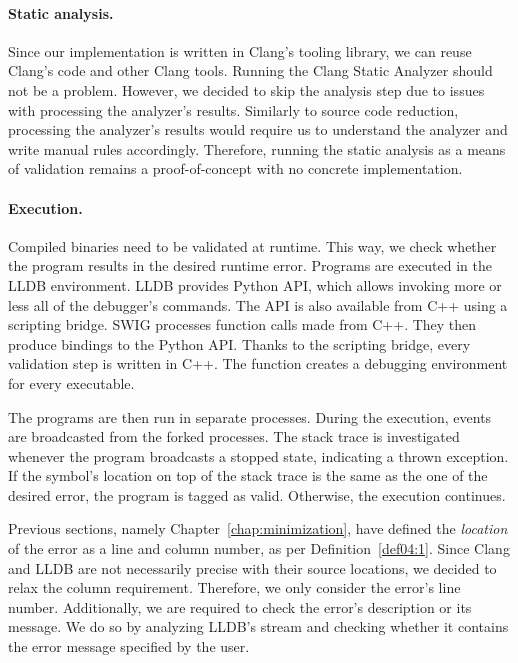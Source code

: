 \paragraph{Static analysis.} Since our implementation is written in Clang's 
tooling library, we can reuse Clang's code and other Clang tools. 
Running the Clang Static Analyzer should not be a problem. 
However, we decided to skip the analysis step due to issues with processing 
the analyzer's results. 
Similarly to source code reduction, processing the analyzer's results would 
require us to understand the analyzer and write manual rules accordingly. 
Therefore, running the static analysis as a means of validation remains 
a proof-of-concept with no concrete implementation.

\paragraph{Execution.} Compiled binaries need to be validated at runtime.
This way, we check whether the program results in the desired runtime error.
Programs are executed in the LLDB environment.
LLDB provides Python API, which allows invoking more or less all of 
the debugger's commands.
The API is also available from C++ using a scripting bridge.
SWIG processes function calls made from C++.
They then produce bindings to the Python API.
Thanks to the scripting bridge, every validation step is written in C++.
The  function creates a debugging environment for every 
executable.

The programs are then run in separate processes.
During the execution, events are broadcasted from the forked processes.
The stack trace is investigated whenever the program broadcasts a stopped 
state, indicating a thrown exception.
If the symbol's location on top of the stack trace is the same as the one of 
the desired error, the program is tagged as valid.
Otherwise, the execution continues.

Previous sections, namely Chapter~\ref{chap:minimization}, have defined 
the \emph{location} of the error as a line and column number, as per 
Definition~\ref{def04:1}. 
Since Clang and LLDB are not necessarily precise with their source locations, 
we decided to relax the column requirement. 
Therefore, we only consider the error's line number. 
Additionally, we are required to check the error's description or its 
message. 
We do so by analyzing LLDB's stream and checking whether it contains 
the error message specified by the user.

